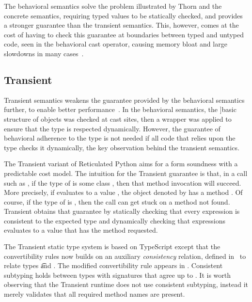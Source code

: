 \documentclass{tex/llncs}
\begin{document}
The behavioral semantics solve the problem illustrated by Thorn and the
concrete semantics, requiring typed values to be statically checked,
and provides a stronger guarantee than the transient semantics. This, however,
comes at the cost of having to check this guarantee at boundaries between
typed and untyped code, seen in the behavioral cast operator, causing memory
bloat and large slowdowns in many cases~\cite{popl16}.

\subsection{Transient}

Transient semantics weakens the guarantee provided by the behavioral semantics
further, to enable better performance~\cite{siek14}. In the behavioral
semantics, the ]basic structure of objects was checked at cast sites, then a
wrapper was applied to ensure that the type is respected dynamically. However,
the guarantee of behavioral adherence to the type is not needed if all code
that relies upon the type checks it dynamically, the key observation behind
the transient semantics. 

The Transient variant of Reticulated Python aims for a form soundness with a
predictable cost model. The intuition for the Transient guarantee is that,
in a call such as \Call\e\m\ep, if the type of \e is some class \C, then that
method invocation will succeed. More precisely, if \e evaluates to a value
\a, the object denoted by \a has a method \m. Of course, if the type of \e is
\any, then the call can get stuck on a method not found. Transient obtains
that guarantee by statically checking that every expression is consistent to
the expected type and dynamically checking that expressions evaluates to a
value that has the method requested.

The Transient static type system is based on TypeScript except that the
convertibility rules now builds on an auxiliary \emph{consistency} relation,
defined in~ to relate types \t and \tp. The modified
convertibility rule appears in . Consistent subtyping holds
between types with signatures that agree up to \any.  It is worth observing
that the Transient runtime does not use consistent subtyping, instead
it merely validates that all required method names are present.
\end{document}

